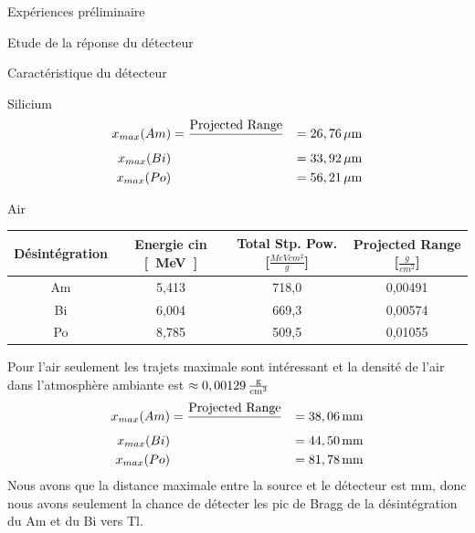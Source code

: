 \documentclass[a4paper,11pt,liststotocnumbered,bibtotocnumbered]{scrartcl}
\begin{document}
\begin{section}{Expériences préliminaire}
\begin{subsection}{Etude de la réponse du détecteur}
\begin{subsubsection}{Caractéristique du détecteur}
\begin{paragraph}{Silicium}
    \begin{eqnarray*}
     x_{max}(Am)&=\frac{\text{Projected Range}}{\rho}&=\unit[26,76]{\mu m}\\
     x_{max}(Bi)&&=\unit[33,92]{\mu m}\\
     x_{max}(Po)&&=\unit[56,21]{\mu m}
    \end{eqnarray*}
   \end{paragraph}
   \begin{paragraph}{Air}
    \begin{center}
     \begin{tabular}{c|c|c|c}
      Désintégration & Energie cin \unit{[MeV]} & Total Stp. Pow. [$\frac{MeV cm^2}{g}$] & Projected Range [$\frac{g}{cm^2}$] \\ \hline
      Am & 5,413 & 718,0 & 0,00491 \\ 
      Bi & 6,004 & 669,3 & 0,00574 \\ 
      Po & 8,785 & 509,5 & 0,01055 \\ 
     \end{tabular}
    \end{center}
    Pour l'air seulement les trajets maximale sont intéressant et la densité de l'air dans l'atmosphère ambiante est $\rho\approx\unit[0,00129]{\frac{g}{cm^3}}$
    \begin{eqnarray*}
     x_{max}(Am)&=\frac{\text{Projected Range}}{\rho}&=\unit[38,06]{mm}\\
     x_{max}(Bi)&&=\unit[44,50]{mm}\\
     x_{max}(Po)&&=\unit[81,78]{mm}
    \end{eqnarray*}
    Nous avons que la distance maximale entre la source et le détecteur est \unit[45]{mm}, donc nous avons seulement la chance de détecter les pic de Bragg de la désintégration du Am et du Bi vers Tl.
   \end{paragraph}
   \end{subsubsection}


\end{subsection}
\end{section}
\end{document}
